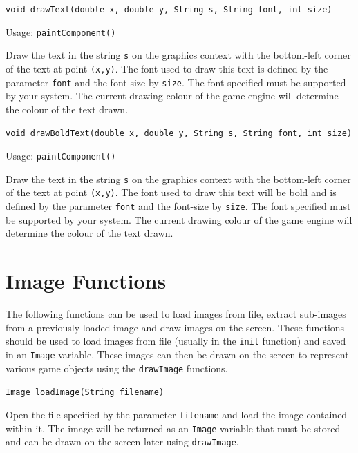 \documentclass[a4paper, 10pt]{report}
\begin{document}
{\large {\tt void drawText(double x, double y, String s, String font, int size)}}

Usage: {\tt paintComponent()}

Draw the text in the string {\tt s} on the graphics context with the bottom-left corner of the text at point {\tt (x,y)}. The font used to draw this text is defined by the parameter {\tt font} and the font-size by {\tt size}. The font specified must be supported by your system. The current drawing colour of the game engine will determine the colour of the text drawn.

\hrulefill

{\large {\tt void drawBoldText(double x, double y, String s, String font, int size)}}

Usage: {\tt paintComponent()}

Draw the text in the string {\tt s} on the graphics context with the bottom-left corner of the text at point {\tt (x,y)}. The font used to draw this text will be bold and is defined by the parameter {\tt font} and the font-size by {\tt size}. The font specified must be supported by your system. The current drawing colour of the game engine will determine the colour of the text drawn.

\section{Image Functions}

The following functions can be used to load images from file, extract sub-images from a previously loaded image and draw images on the screen. These functions should be used to load images from file (usually in the {\tt init} function) and saved in an {\tt Image} variable. These images can then be drawn on the screen to represent various game objects using the {\tt drawImage} functions.

\hrulefill

{\large {\tt Image loadImage(String filename)}}

Open the file specified by the parameter {\tt filename} and load the image contained within it. The image will be returned as an {\tt Image} variable that must be stored and can be drawn on the screen later using {\tt drawImage}.

\hrulefill
\end{document}
